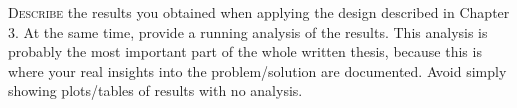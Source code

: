 \lettrine{D}{escribe} the results you obtained when applying the design described in Chapter 3.
At the same time, provide a running analysis of the results. This analysis is probably
the most important part of the whole written thesis, because this is where your real
insights into the problem/solution are documented. Avoid simply showing
plots/tables of results with no analysis.


